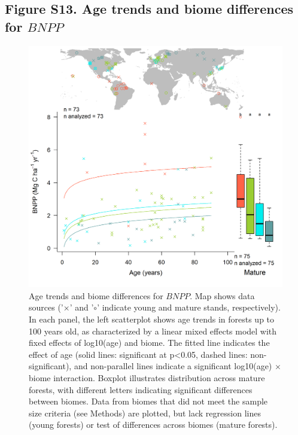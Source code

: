 \documentclass[
]{article}
\begin{document}
\newpage

\hypertarget{figure-s13.-age-trends-and-biome-differences-for-bnpp}{%
\subsection{\texorpdfstring{Figure S13. Age trends and biome differences
for
\(BNPP\)}{Figure S13. Age trends and biome differences for BNPP}}\label{figure-s13.-age-trends-and-biome-differences-for-bnpp}}

\begin{figure}[H]

{\centering \includegraphics[width=1\linewidth]{tables_figures/age_trends/BNPP_with_map} 

}

\caption{Age trends and biome differences for $BNPP$. Map shows data sources ('$\times$' and '$\circ$' indicate young and mature stands, respectively). In each panel, the left scatterplot shows age trends in forests up to 100 years old, as characterized by a linear mixed effects model with fixed effects of log10(age) and biome. The fitted line indicates the effect of age (solid lines: significant at p<0.05, dashed lines: non-significant), and non-parallel lines indicate a significant log10(age) $\times$ biome interaction. Boxplot illustrates distribution across mature forests, with different letters indicating significant differences between biomes. Data from biomes that did not meet the sample size criteria (see Methods) are plotted, but lack regression lines (young forests) or test of differences across biomes (mature forests).}\label{fig:unnamed-chunk-16}
\end{figure}
\end{document}
